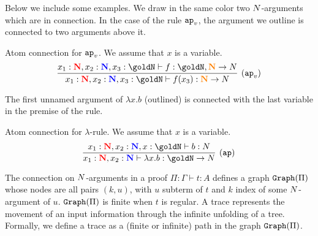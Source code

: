 Below we include some examples. 
We draw in the same color two ${N}$-arguments which are in connection. 
In the case of the rule $\apvar$, the argument we outline is 
connected to two arguments above it.


\begin{Eg}\label{eg:3}%
Atom connection for $\apvar$.
We assume that $x$ is a variable.
\[
\infer[(\apvar)]{
  x_1 : \bfColor{red}{\N},{x_2} : \bfColor{blue}{\N}, x_3  : \goldN
  \prove f(x_3) : \bfColor{orange}{\N} \rightarrow \N
}{
  x_1 : \bfColor{red}{\N},{x_2} : \bfColor{blue}{\N}, x_3  : \goldN
  \prove f : \goldN, \bfColor{orange}{\N} \rightarrow \N
}
\]
\end{Eg}

The first unnamed argument of $\lambda x.b$ (outlined)
is connected with the last variable in the premise of the rule.


\begin{Eg}\label{eg:4}%
Atom connection for  $\lambda$-rule.
We assume that $x$ is  a variable.
\[
\infer[(\ap)]{
  x_1: \bfColor{red}{\N}, x_2: \bfColor{blue}{\N}
  \prove \lambda x.b : \goldN \rightarrow \N
}{
  x_1: \bfColor{red}{\N}, x_2: \bfColor{blue}{\N}, x:\goldN \prove b : \N
}
\]
\end{Eg}




The connection on ${N}$-arguments in a proof $\Pi:\Gamma\vdash t:A$ defines a 
graph ${\tt Graph}(\Pi)$ whose nodes are all pairs $(k,u)$, with $u$ subterm of $t$ and 
$k$ index of some ${N}$-argument of  $u$. ${\tt Graph}(\Pi)$ is finite when $t$ is 
regular. A trace represents the movement of an input information through the 
infinite unfolding of a tree. Formally, we define a trace as a (finite or infinite) path 
in the graph ${\tt Graph}(\Pi)$.

